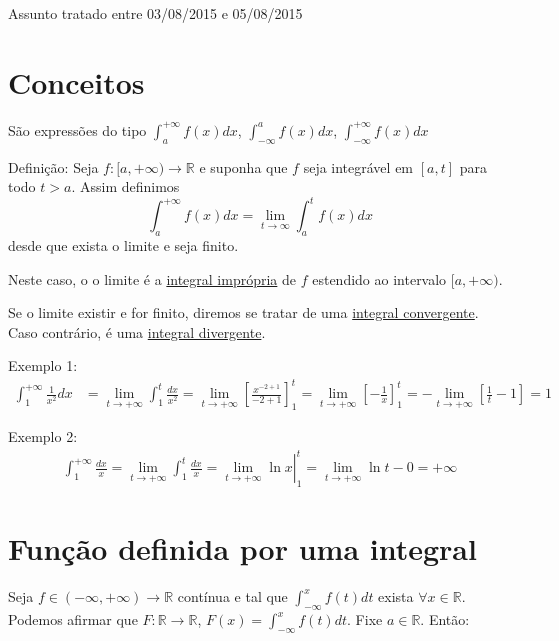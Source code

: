 \documentclass[12pt,openany]{book}
\begin{document}
\hspace{5mm} Assunto tratado entre 03/08/2015 e 05/08/2015
\section{Conceitos}
\label{sec:s11}

\hspace{5mm} São expressões do tipo $\displaystyle{\int_a^{+ \infty}f(x)dx}$, $\displaystyle{\int_{-\infty}^{a} f(x)dx}$, $\displaystyle{\int_{-\infty}^{+ \infty}f(x)dx}$\\
\vspace{15pt}

Definição: Seja $f:{[a,+\infty)}\rightarrow \mathds{R}$ e suponha que $f$ seja integrável em $[a,t]$ para todo $t>a$. Assim definimos $$ \int_a^{+\infty}f(x)dx = \lim_{t\rightarrow\infty}\int_a^t f(x)dx$$ desde que exista o limite e seja finito.

Neste caso, o o limite é a \underline{integral imprópria} de $f$ estendido ao intervalo $[a,+\infty)$.

Se o limite existir e for finito, diremos se tratar de uma \underline{integral convergente}. Caso contrário, é uma \underline{integral divergente}.

Exemplo 1:
\begin{align*}
\int_1^{+\infty}\frac{1}{x^2}dx &= \lim_{t\rightarrow + \infty}\int_1^t \frac{dx}{x^2}=\lim_{t\rightarrow + \infty}\left[\frac{x^{-2+1}}{-2+1}\right]_1^t = \lim_{t\rightarrow + \infty}\left[-\frac{1}{x}\right]_1^t = -\lim_{t\rightarrow + \infty}\left[\frac{1}{t}-1\right]=1
\end{align*}

Exemplo 2:
\begin{align*}
\int_1^{+\infty}\frac{dx}{x}= \lim_{t\rightarrow + \infty}\int_1^t\frac{dx}{x}= \left.\lim_{t\rightarrow + \infty}\ln x \right|_1^t = \lim_{t\rightarrow + \infty}\ln t - 0 = +\infty
\end{align*}

\section{Função definida por uma integral}
\label{sec:s12}

\hspace{5mm} Seja $f \in (-\infty, +\infty) \rightarrow \mathds{R}$ contínua e tal que $\displaystyle{\int_{-\infty}^x f(t)dt}$ exista $\displaystyle{\forall x \in \mathds{R}}$. Podemos afirmar que $F:\mathds{R}\rightarrow\mathds{R}$, $\displaystyle{F(x)=\int_{-\infty}^x f(t)dt}$. Fixe $a \in \mathds{R}$. Então:
\end{document}
